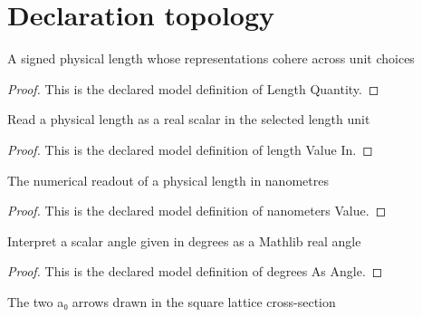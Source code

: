 \section{Declaration topology}
\begin{definition}
  \label{def:physics:phyx-mini-0080:phyxminiproblems-problemphyxmini0080-lengthquantity}
  A signed physical length whose representations cohere across unit choices
\end{definition}
\begin{proof}
  This is the declared model definition of Length Quantity.
\end{proof}
\begin{definition}
  \label{def:physics:phyx-mini-0080:phyxminiproblems-problemphyxmini0080-lengthvaluein}
  Read a physical length as a real scalar in the selected length unit
\end{definition}
\begin{proof}
  This is the declared model definition of length Value In.
\end{proof}
\begin{definition}
  \label{def:physics:phyx-mini-0080:phyxminiproblems-problemphyxmini0080-nanometersvalue}
  The numerical readout of a physical length in nanometres
\end{definition}
\begin{proof}
  This is the declared model definition of nanometers Value.
\end{proof}
\begin{definition}
  \label{def:physics:phyx-mini-0080:phyxminiproblems-problemphyxmini0080-degreesasangle}
  Interpret a scalar angle given in degrees as a Mathlib real angle
\end{definition}
\begin{proof}
  This is the declared model definition of degrees As Angle.
\end{proof}
\begin{definition}
  \label{def:physics:phyx-mini-0080:phyxminiproblems-problemphyxmini0080-unitcelledgelabel}
  The two a₀ arrows drawn in the square lattice cross-section
\end{definition}
